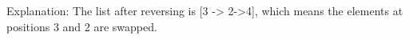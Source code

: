 \documentclass[preview]{standalone}
\begin{document}
Explanation: The list after reversing is [3 -> 2->4], which means the elements at positions 3 and 2 are swapped.\\
\end{document}
